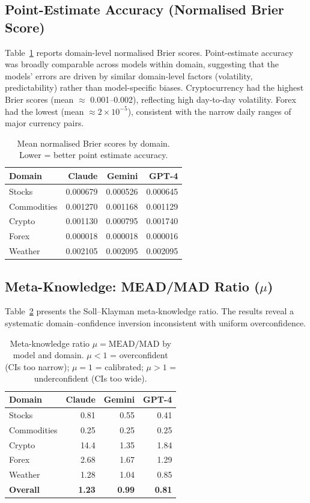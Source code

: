 \documentclass[9pt,twoside,lineno]{pnas-new}
\begin{document}
\subsection*{Point-Estimate Accuracy (Normalised Brier Score)}

Table~\ref{tab:brier} reports domain-level normalised Brier scores. Point-estimate accuracy was broadly comparable across models within domain, suggesting that the models' errors are driven by similar domain-level factors (volatility, predictability) rather than model-specific biases. Cryptocurrency had the highest Brier scores (mean $\approx$ 0.001--0.002), reflecting high day-to-day volatility. Forex had the lowest (mean $\approx 2\times10^{-5}$), consistent with the narrow daily ranges of major currency pairs.

\begin{table}[h]
\centering
\caption{Mean normalised Brier scores by domain. Lower = better point estimate accuracy.}
\label{tab:brier}
\begin{tabular}{lrrr}
\hline
\textbf{Domain} & \textbf{Claude} & \textbf{Gemini} & \textbf{GPT-4} \\
\hline
Stocks      & 0.000679 & 0.000526 & 0.000645 \\
Commodities & 0.001270 & 0.001168 & 0.001129 \\
Crypto      & 0.001130 & 0.000795 & 0.001740 \\
Forex       & 0.000018 & 0.000018 & 0.000016 \\
Weather     & 0.002105 & 0.002095 & 0.002095 \\
\hline
\end{tabular}
\end{table}

\subsection*{Meta-Knowledge: MEAD/MAD Ratio ($\mu$)}

Table~\ref{tab:mu} presents the Soll--Klayman meta-knowledge ratio. The results reveal a systematic domain--confidence inversion inconsistent with uniform overconfidence.

\begin{table}[h]
\centering
\caption{Meta-knowledge ratio $\mu = \text{MEAD}/\text{MAD}$ by model and domain. $\mu < 1$ = overconfident (CIs too narrow); $\mu = 1$ = calibrated; $\mu > 1$ = underconfident (CIs too wide).}
\label{tab:mu}
\begin{tabular}{lrrr}
\hline
\textbf{Domain} & \textbf{Claude} & \textbf{Gemini} & \textbf{GPT-4} \\
\hline
Stocks      & 0.81 & 0.55 & 0.41 \\
Commodities & 0.25 & 0.25 & 0.25 \\
Crypto      & 14.4 & 1.35 & 1.84 \\
Forex       & 2.68 & 1.67 & 1.29 \\
Weather     & 1.28 & 1.04 & 0.85 \\
\hline
\textbf{Overall} & \textbf{1.23} & \textbf{0.99} & \textbf{0.81} \\
\hline
\end{tabular}
\end{table}
\end{document}
